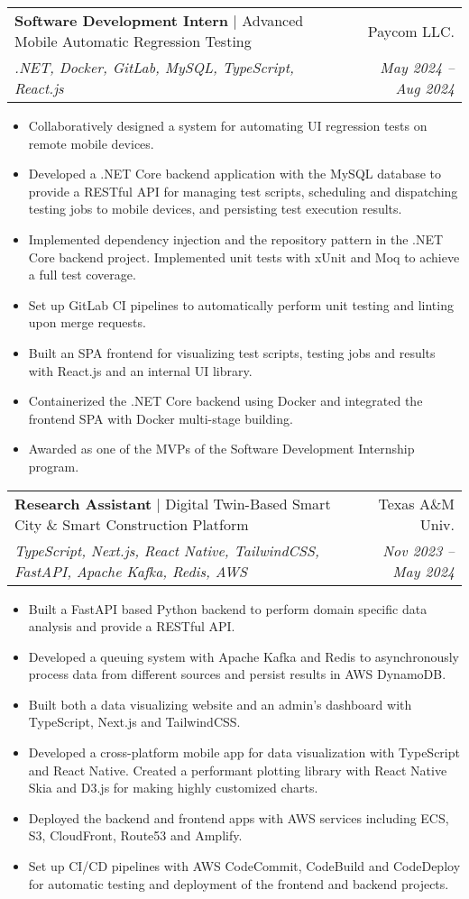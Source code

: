 \documentclass[letterpaper,11pt]{article}
\makeatletter
\newcommand{\mySecondaryItem}[1]{
  \item\raggedright\small{#1\vspace{-.5pt}}
}
\newcommand{\twoRowSubHeading}[5]{
  \item
  \begin{tabular*}{0.97\textwidth}{l@{\extracolsep{\fill}}r}
    \textbf{#1} | {#2} & {#3} \\
    \small{\textit{#4}} & \textit{\small{#5}} \\
  \end{tabular*}\vspace{-5pt}
}
\newcommand{\itemListStart}{\begin{itemize}[leftmargin=*]}
\newcommand{\itemListEnd}{\end{itemize}\vspace{-5pt}}
\makeatother
\begin{document}
\twoRowSubHeading
{Software Development Intern}
{Advanced Mobile Automatic Regression Testing}
{Paycom LLC.}
{.NET, Docker, GitLab, MySQL, TypeScript, React.js}
{May 2024 -- Aug 2024}
\itemListStart
\mySecondaryItem{
  Collaboratively designed a system for automating UI regression tests on remote mobile devices.
}
\mySecondaryItem{
  Developed a .NET Core backend application with the MySQL database to provide a RESTful API for
  managing test scripts, scheduling and dispatching testing jobs to mobile devices, and persisting test execution results.
}
\mySecondaryItem{
  Implemented dependency injection and the repository pattern in the .NET Core backend project. Implemented unit tests with xUnit and Moq to achieve a full test coverage.
}
\mySecondaryItem{
  Set up GitLab CI pipelines to automatically perform unit testing and linting upon merge requests.
}
\mySecondaryItem{
  Built an SPA frontend for visualizing test scripts, testing jobs and results with React.js and an internal UI library.
}
\mySecondaryItem{
  Containerized the .NET Core backend using Docker and integrated the frontend SPA with Docker multi-stage building.
}
\mySecondaryItem{
  Awarded as one of the MVPs of the Software Development Internship program. 
}
\itemListEnd

\twoRowSubHeading
{Research Assistant}
{Digital Twin-Based Smart City \& Smart Construction Platform
}
{Texas A\&M Univ.}
{TypeScript, Next.js, React Native, TailwindCSS, FastAPI, Apache Kafka, Redis, AWS}
{Nov 2023 -- May 2024}
\itemListStart
\mySecondaryItem{
  Built a FastAPI based Python backend to perform domain specific data analysis and provide a RESTful API.
}
\mySecondaryItem{
  Developed a queuing system with Apache Kafka and Redis to asynchronously process data from different sources and persist results in AWS DynamoDB.
}
\mySecondaryItem{
  Built both a data visualizing website and an admin's dashboard with TypeScript, Next.js and TailwindCSS.
}
\mySecondaryItem{
  Developed a cross-platform mobile app for data visualization with TypeScript and React Native. Created a performant plotting library with React Native Skia and D3.js for making highly customized charts.
}
\mySecondaryItem{
  Deployed the backend and frontend apps with AWS services including ECS, S3, CloudFront, Route53 and Amplify.
}
\mySecondaryItem{
  Set up CI/CD pipelines with AWS CodeCommit, CodeBuild and CodeDeploy for automatic testing and deployment of the frontend and backend projects.
}
\itemListEnd
\end{document}
